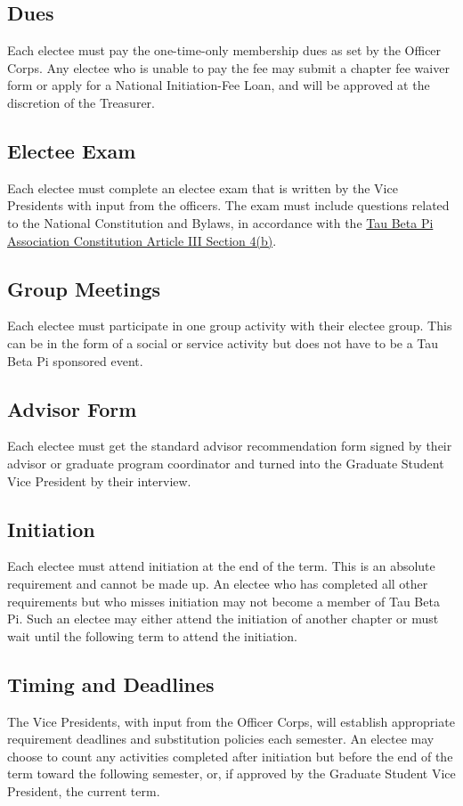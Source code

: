 \subsection{Dues} \label{B.5}

Each electee must pay the one-time-only membership dues as set by the Officer Corps. 
Any electee who is unable to pay the fee may submit a chapter fee waiver form or apply for a National Initiation-Fee Loan, and will be approved at the discretion of the Treasurer.

\subsection{Electee Exam} \label{B.6}
Each electee must complete an electee exam that is written by the Vice Presidents with input from the officers. 
The exam must include questions related to the National Constitution and Bylaws, in accordance with the \href{http://www.tbp.org/off/ConstBylaw.pdf}{Tau Beta Pi Association Constitution Article III Section 4(b)}. 


\subsection{Group Meetings} \label{B.7}

Each electee must participate in one group activity with their electee group. 
This can be in the form of a social or service activity but does not have to be a Tau Beta Pi sponsored event.

\subsection{Advisor Form} \label{B.8}

Each electee must get the standard advisor recommendation
form signed by their advisor or graduate program coordinator and turned into the
Graduate Student Vice President by their interview.

\subsection{Initiation} \label{B.9}

Each electee must attend initiation at the end of the term. This
is an absolute requirement and cannot be made up. An electee who has completed all other
requirements but who misses initiation may not become a member of Tau Beta Pi. Such an
electee may either attend the initiation of another chapter or must wait until the following
term to attend the initiation.


\subsection{Timing and Deadlines} \label{B.10}

The Vice Presidents, with input from the Officer Corps, will establish appropriate requirement deadlines and substitution policies each semester. 
An electee may choose to count any activities completed after initiation but before the end of the term toward the following semester, or, 
if approved by the Graduate Student Vice President, the current term.